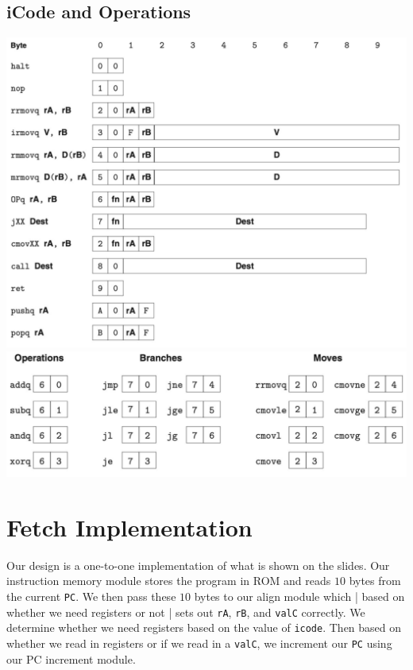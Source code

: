\documentclass{article}
\begin{document}
\subsection{iCode and Operations}
\begin{center}
    \includegraphics[scale=.6]{icode.png} \\
    \includegraphics[scale=.8]{ops.png} 
\end{center}
\section{Fetch Implementation}
Our design is a one-to-one implementation of what is shown on the slides. Our instruction memory module stores the program in ROM and reads $10$ bytes from the current \verb+PC+. We then pass these $10$ bytes to our align module which | based on whether we need registers or not | sets out \verb+rA+, \verb+rB+, and \verb+valC+ correctly. We determine whether we need registers based on the value of \verb+icode+. Then based on whether we read in registers or if we read in a  \verb+valC+, we increment our \verb+PC+ using our PC increment module.
\end{document}
